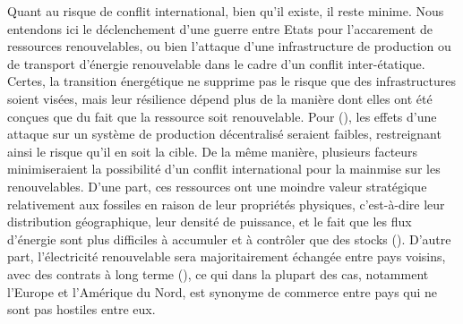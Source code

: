Quant au risque de conflit international, bien qu'il existe, il reste minime. Nous entendons ici le déclenchement d'une guerre entre Etats pour l'accarement de ressources renouvelables, ou bien l'attaque d'une infrastructure de production ou de transport d'énergie renouvelable dans le cadre d'un conflit inter-étatique. Certes, la transition énergétique ne supprime pas le risque que des infrastructures soient visées, mais leur résilience dépend plus de la manière dont elles ont été conçues que du fait que la ressource soit renouvelable. Pour (\cite{mansson_resource_2015}), les effets d'une attaque sur un système de production décentralisé seraient faibles, restreignant ainsi le risque qu'il en soit la cible. De la même manière, plusieurs facteurs minimiseraient la possibilité d'un conflit international pour la mainmise sur les renouvelables. D'une part, ces ressources ont une moindre valeur stratégique relativement aux fossiles en raison de leur propriétés physiques, c'est-à-dire leur distribution géographique, leur densité de puissance, et le fait que les flux d'énergie sont plus difficiles à accumuler et à contrôler que des stocks (\cite{mansson_resource_2015}). D'autre part, l'électricité renouvelable sera majoritairement échangée entre pays voisins, avec des contrats à long terme (\cite{overland_geopolitics_2019}), ce qui dans la plupart des cas, notamment l'Europe et l'Amérique du Nord, est synonyme de commerce entre pays qui ne sont pas hostiles entre eux.